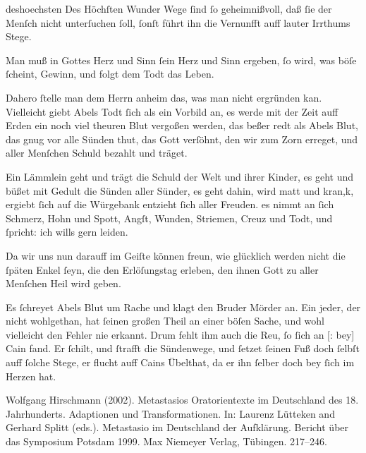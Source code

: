 \documentclass[tocstyle=ref-genre]{ees}
\begin{document}
{\begin{movement}{deshoechsten}
  \voice[Adam]
  Des Höchſten Wunder Wege
  ſind ſo geheimnißvoll,
  daß ſie der Menſch nicht unterſuchen ſoll,
  ſonſt führt ihn die Vernunfft auff lauter Irrthums Stege.
\end{movement}

\begin{movement}{}
  \voice[Chor]
  Man muß in Gottes Herz und Sinn
  ſein Herz und Sinn ergeben,
  ſo wird, was böſe ſcheint, Gewinn,
  und folgt dem Todt das Leben.
\end{movement}

\begin{movement}{}
  \voice[Adam]
  Dahero ſtelle man dem Herrn anheim
  das, was man nicht ergründen kan.
  Vielleicht giebt Abels Todt ſich als ein Vorbild an,
  es werde mit der Zeit auff Erden
  ein noch viel theuren Blut vergoßen werden,
  das beßer redt als Abels Blut,
  das gnug vor alle Sünden thut,
  das Gott verſöhnt, den wir zum Zorn erreget,
  und aller Menſchen Schuld bezahlt und träget.
\end{movement}

\begin{movement}{}
  \voice[Chor]
  Ein Lämmlein geht und trägt die Schuld
  der Welt und ihrer Kinder,
  es geht und büßet mit Gedult
  die Sünden aller Sünder,
  es geht dahin, wird matt und kran,k,
  ergiebt ſich auf die Würgebank
  entzieht ſich aller Freuden.
  es nimmt an ſich Schmerz, Hohn und Spott,
  Angſt, Wunden, Striemen, Creuz und Todt,
  und ſpricht: ich wills gern leiden.
\end{movement}

\begin{movement}{}
  \voice[Adam]
  Da wir uns nun darauff im Geiſte können freun,
  wie glücklich werden nicht die ſpäten Enkel ſeyn,
  die den Erlöſungstag erleben,
  den ihnen Gott
  zu aller Menſchen Heil wird geben.
\end{movement}

\begin{movement}{}
  \voice[Chor]
  Es ſchreyet Abels Blut um Rache
  und klagt den Bruder Mörder an.
  Ein jeder, der nicht wohlgethan,
  hat ſeinen großen Theil an einer böſen Sache,
  und wohl vielleicht den Fehler nie erkannt.
  Drum fehlt ihm auch die Reu, ſo ſich an [: bey] Cain fand.
  Er ſchilt, und ſtrafft die Sündenwege,
  und ſetzet ſeinen Fuß doch ſelbſt auff ſolche Stege,
  er flucht auff Cains Übelthat,
  da er ihn ſelber doch bey ſich im Herzen hat.
\end{movement}
}

\eesScore

Wolfgang Hirschmann (2002). Metastasios Oratorientexte im Deutschland des 18. Jahrhunderts. Adaptionen und Transformationen. In: Laurenz Lütteken and Gerhard Splitt (eds.). Metastasio im Deutschland der Aufklärung. Bericht über das Symposium Potsdam 1999. Max Niemeyer Verlag, Tübingen. 217–246.
\end{document}
